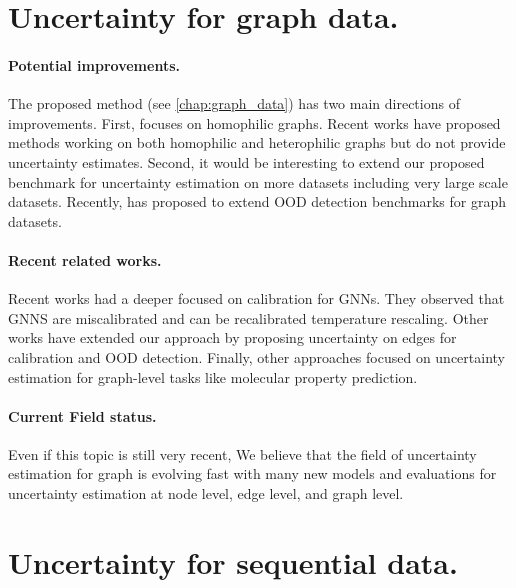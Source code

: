 \section{Uncertainty for graph data.}

\paragraph{Potential improvements.} The proposed method \GPNacro{} (see \cref{chap:graph_data}) has two main directions of improvements. First, \GPNacro{} focuses on homophilic graphs. Recent works have proposed methods \cite{bodnar2022sheaf, giovanni2022graff} working on both homophilic and heterophilic graphs but do not provide uncertainty estimates. Second, it would be interesting to extend our proposed benchmark for uncertainty estimation on more datasets including very large scale datasets. Recently, \cite{gui2022good} has proposed to extend OOD detection benchmarks for graph datasets.


\paragraph{Recent related works.} Recent works \cite{texeira2019GNNmiscalibrated, hsu2022GNNmiscalibrated, wang2021confident} had a deeper focused on calibration for GNNs. They observed that GNNS are miscalibrated and can be recalibrated temperature rescaling. Other works \cite{zhou2022OODlink, hsu2022structure} have extended our approach by proposing uncertainty on edges for calibration and OOD detection. Finally, other approaches \cite{soleimany2021evidential} focused on uncertainty estimation for graph-level tasks like molecular property prediction.

\paragraph{Current Field status.} Even if this topic is still very recent, We believe that the field of uncertainty estimation for graph is evolving fast with many new models and evaluations for uncertainty estimation at node level, edge level, and graph level. 

\section{Uncertainty for sequential data.}

